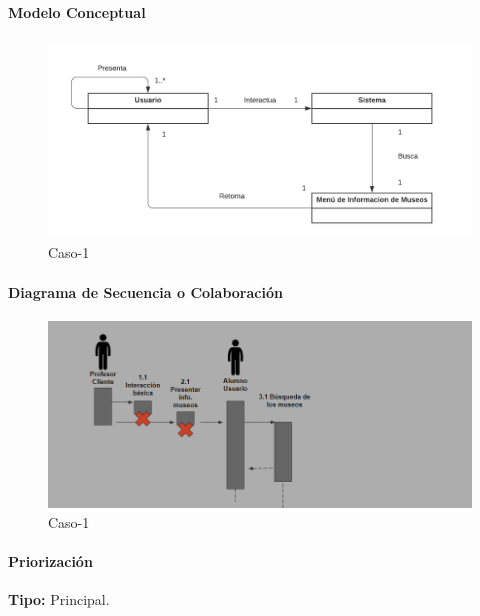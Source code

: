 \paragraph{Modelo Conceptual}

\begin{figure}[H]
\centerline{\includegraphics[width=15cm]{imgs/ModeloConceptualCaso_5_3.png}}
\caption{Caso-1}
\label{fig}
\end{figure}

\paragraph{Diagrama de Secuencia o Colaboración}

\begin{figure}[H]
\centerline{\includegraphics[width=15cm]{imgs/CasoUso_5_2.PNG}}
\caption{Caso-1}
\label{fig}
\end{figure}

\paragraph{Priorización}
{\textbf {Tipo:}}
Principal.